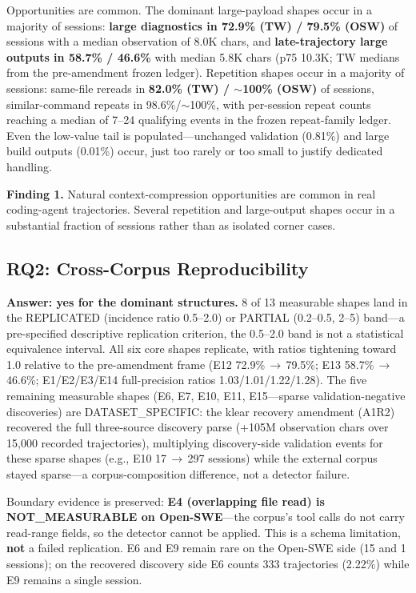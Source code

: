 ﻿\documentclass[sigconf,balance=false]{acmart}
\newenvironment{findingbox}{\par\vskip 3pt\noindent\begin{minipage}{\linewidth}}{\end{minipage}\par\vskip 3pt}
\begin{document}
Opportunities are common. The dominant large-payload shapes occur in a majority of sessions: \textbf{large diagnostics in 72.9\% (TW) / 79.5\% (OSW)} of sessions with a median observation of 8.0K chars, and \textbf{late-trajectory large outputs in 58.7\% / 46.6\%} with median 5.8K chars (p75 10.3K; TW medians from the pre-amendment frozen ledger). Repetition shapes occur in a majority of sessions: same-file rereads in \textbf{82.0\% (TW) / $\sim$100\% (OSW)} of sessions, similar-command repeats in 98.6\%/$\sim$100\%, with per-session repeat counts reaching a median of 7--24 qualifying events in the frozen repeat-family ledger. Even the low-value tail is populated---unchanged validation (0.81\%) and large build outputs (0.01\%) occur, just too rarely or too small to justify dedicated handling.

\begin{findingbox}
\textbf{Finding 1.} Natural context-compression opportunities are common in real coding-agent trajectories. Several repetition and large-output shapes occur in a substantial fraction of sessions rather than as isolated corner cases.
\end{findingbox}

\subsection{RQ2: Cross-Corpus Reproducibility}

\textbf{Answer: yes for the dominant structures.} 8 of 13 measurable shapes land in the REPLICATED (incidence ratio 0.5--2.0) or PARTIAL (0.2--0.5, 2--5) band---a pre-specified descriptive replication criterion, the 0.5--2.0 band is not a statistical equivalence interval. All six core shapes replicate, with ratios tightening toward 1.0 relative to the pre-amendment frame (E12 72.9\%\,$\rightarrow$\,79.5\%; E13 58.7\%\,$\rightarrow$\,46.6\%; E1/E2/E3/E14 full-precision ratios 1.03/1.01/1.22/1.28). The five remaining measurable shapes (E6, E7, E10, E11, E15---sparse validation-negative discoveries) are DATASET\_SPECIFIC: the klear recovery amendment (A1R2) recovered the full three-source discovery parse (+105M observation chars over 15{,}000 recorded trajectories), multiplying discovery-side validation events for these sparse shapes (e.g., E10 17\,$\rightarrow$\,297 sessions) while the external corpus stayed sparse---a corpus-composition difference, not a detector failure.

Boundary evidence is preserved: \textbf{E4 (overlapping file read) is NOT\_MEASURABLE on Open-SWE}---the corpus's tool calls do not carry read-range fields, so the detector cannot be applied. This is a schema limitation, \textbf{not} a failed replication. E6 and E9 remain rare on the Open-SWE side (15 and 1 sessions); on the recovered discovery side E6 counts 333 trajectories (2.22\%) while E9 remains a single session.
\end{document}
